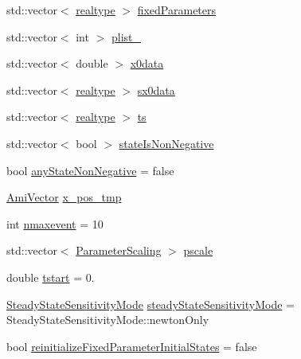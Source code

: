 \begin{DoxyCompactItemize}
\item 
std\+::vector$<$ \mbox{\hyperlink{namespaceamici_a1bdce28051d6a53868f7ccbf5f2c14a3}{realtype}} $>$ \mbox{\hyperlink{classamici_1_1_model_ac1d5115134ec1c839f1e913724ceb2b4}{fixed\+Parameters}}
\item 
std\+::vector$<$ int $>$ \mbox{\hyperlink{classamici_1_1_model_a67919df701b4afd60d13fc890432d9ec}{plist\+\_\+}}
\item 
std\+::vector$<$ double $>$ \mbox{\hyperlink{classamici_1_1_model_ac305126c59aab952182f851679df24f9}{x0data}}
\item 
std\+::vector$<$ \mbox{\hyperlink{namespaceamici_a1bdce28051d6a53868f7ccbf5f2c14a3}{realtype}} $>$ \mbox{\hyperlink{classamici_1_1_model_a7ebdaf00a4177be525b45a39edf1865c}{sx0data}}
\item 
std\+::vector$<$ \mbox{\hyperlink{namespaceamici_a1bdce28051d6a53868f7ccbf5f2c14a3}{realtype}} $>$ \mbox{\hyperlink{classamici_1_1_model_aa7014a80e7b102f85a10e3b9a480e8e5}{ts}}
\item 
std\+::vector$<$ bool $>$ \mbox{\hyperlink{classamici_1_1_model_a30f9edd35aad3ccaba31f67331881da5}{state\+Is\+Non\+Negative}}
\item 
bool \mbox{\hyperlink{classamici_1_1_model_a2b314d4bdf8555d609a69846b4ab0934}{any\+State\+Non\+Negative}} = false
\item 
\mbox{\hyperlink{classamici_1_1_ami_vector}{Ami\+Vector}} \mbox{\hyperlink{classamici_1_1_model_a2dc43104a5b25d9689d827fc51f04346}{x\+\_\+pos\+\_\+tmp}}
\item 
int \mbox{\hyperlink{classamici_1_1_model_aff0f3f25d886279a90dbf0571956885c}{nmaxevent}} = 10
\item 
std\+::vector$<$ \mbox{\hyperlink{namespaceamici_a42f062082226e9284c201d9eab71a3a0}{Parameter\+Scaling}} $>$ \mbox{\hyperlink{classamici_1_1_model_a5d1c7237dc998202fe1b3393b50f77ce}{pscale}}
\item 
double \mbox{\hyperlink{classamici_1_1_model_a514d7e4eb49966fc7d165e0f87fe7f3c}{tstart}} = 0.
\item 
\mbox{\hyperlink{namespaceamici_a1f7d44f04185d57423d01d47d13470a6}{Steady\+State\+Sensitivity\+Mode}} \mbox{\hyperlink{classamici_1_1_model_a27c46c338afef0ba6da6d0695aa5e844}{steady\+State\+Sensitivity\+Mode}} = Steady\+State\+Sensitivity\+Mode\+::newton\+Only
\item 
bool \mbox{\hyperlink{classamici_1_1_model_a48ac1f2997787adc548bd6bfcec857d5}{reinitialize\+Fixed\+Parameter\+Initial\+States}} = false
\end{DoxyCompactItemize}
